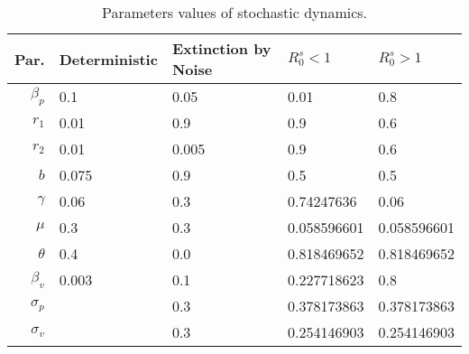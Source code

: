 \begin{table}
	\begin{center}
		\begin{tabular}{rllll} 
			\toprule
			Par. & Deterministic & Extinction by Noise & $R^s_0<1$ & $R^s_0>1$ 
			\\ 
			\midrule
				$\beta_p$ 
				& 
                    0.1
                &
				    0.05 
				& 
				    0.01 
				& 
				    0.8 
			\\ 
				$r_1$
				&
				    0.01
				&
				    0.9 
				& 
				    0.9
				& 
				    0.6
			\\
				$r_2$ 
				&
				    0.01
				&
				    0.005 
				& 
				    0.9 
				& 
				    0.6
			\\
				$b$ 
				&
				    0.075
				&
				    0.9 
				&   
				    0.5
				& 
				    0.5 
			\\
				$\gamma$ 
				&
				    0.06
				&
				    0.3
				& 
				    0.74247636 
				& 
				    0.06
			\\
				$\mu$ 
				&
				    0.3
				&
				    0.3 
				& 
				    0.058596601 
				& 
				0.058596601
			\\
				$\theta$ 
				&
				    0.4
				&
				    0.0 
				&   
				    0.818469652
				&   
				    0.818469652
			\\
				$\beta_v$ 
			    &
			        0.003
			    &
			        0.1 
			    & 
			        0.227718623 
			    & 
			        0.8
			\\
			    $\sigma_p$ 
			    &
			    
			    &
			        0.3 
			    & 
			        0.378173863 
			    & 
			        0.378173863
			\\
                $\sigma_v$ 
                & 
                
                &
                    0.3 
                & 
                    0.254146903 
                & 
                    0.254146903 
            \\
			\bottomrule
		\end{tabular}
	\end{center}
	\caption{
		Parameters values of
		stochastic dynamics.
	}
	\label{tbl:value}
	\end{table}

